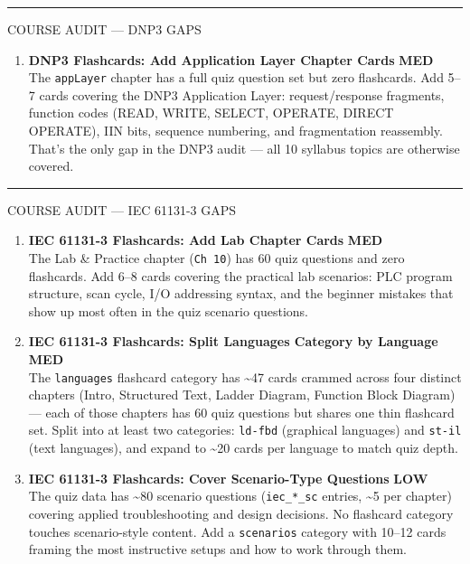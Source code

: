 \documentclass[10pt]{article}
\newcommand{\med}{\textcolor{samber}{\small\bfseries MED}}
\newcommand{\low}{\textcolor{sgreen}{\small\bfseries LOW}}
\begin{document}
\smallskip
{\color{snavy}\rule{\linewidth}{0.4pt}}
\smallskip

{\small\sffamily\color{sgray}\MakeUppercase{Course Audit — DNP3 Gaps}}
\smallskip

\begin{enumerate}[resume]\small
  \item \textbf{DNP3 Flashcards: Add Application Layer Chapter Cards} \hfill \med \\
    The \texttt{appLayer} chapter has a full quiz question set but zero flashcards. Add 5--7 cards covering the DNP3 Application Layer: request/response fragments, function codes (READ, WRITE, SELECT, OPERATE, DIRECT OPERATE), IIN bits, sequence numbering, and fragmentation reassembly. That's the only gap in the DNP3 audit — all 10 syllabus topics are otherwise covered.
\end{enumerate}

\smallskip
{\color{snavy}\rule{\linewidth}{0.4pt}}
\smallskip

{\small\sffamily\color{sgray}\MakeUppercase{Course Audit — IEC 61131-3 Gaps}}
\smallskip

\begin{enumerate}[resume]\small
  \item \textbf{IEC 61131-3 Flashcards: Add Lab Chapter Cards} \hfill \med \\
    The Lab \& Practice chapter (\texttt{Ch 10}) has 60 quiz questions and zero flashcards. Add 6--8 cards covering the practical lab scenarios: PLC program structure, scan cycle, I/O addressing syntax, and the beginner mistakes that show up most often in the quiz scenario questions.

  \item \textbf{IEC 61131-3 Flashcards: Split Languages Category by Language} \hfill \med \\
    The \texttt{languages} flashcard category has \textasciitilde47 cards crammed across four distinct chapters (Intro, Structured Text, Ladder Diagram, Function Block Diagram) — each of those chapters has 60 quiz questions but shares one thin flashcard set. Split into at least two categories: \texttt{ld-fbd} (graphical languages) and \texttt{st-il} (text languages), and expand to \textasciitilde20 cards per language to match quiz depth.

  \item \textbf{IEC 61131-3 Flashcards: Cover Scenario-Type Questions} \hfill \low \\
    The quiz data has \textasciitilde80 scenario questions (\texttt{iec\_*\_sc} entries, \textasciitilde5 per chapter) covering applied troubleshooting and design decisions. No flashcard category touches scenario-style content. Add a \texttt{scenarios} category with 10--12 cards framing the most instructive setups and how to work through them.
\end{enumerate}
\end{document}
